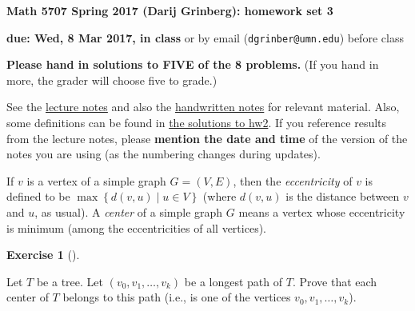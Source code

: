 \documentclass[numbers=enddot,12pt,final,onecolumn,notitlepage]{scrartcl}%
\newcounter{exer}
\theoremstyle{definition}
\newtheorem{exmp}[exer]{Exercise}
\newenvironment{exercise}[1][]
{\begin{exmp}[#1]\begin{leftbar}}
{\end{leftbar}\end{exmp}}
\newcommand{\set}[1]{\left\{ #1 \right\}}
\newcommand{\tup}[1]{\left( #1 \right)}
\begin{document}
\begin{center}
\textbf{Math 5707 Spring 2017 (Darij Grinberg): homework set 3}

\textbf{due: Wed, 8 Mar 2017, in class} or by email
(\texttt{dgrinber@umn.edu}) before class

\textbf{Please hand in solutions to FIVE of the 8 problems.}
{\color{red}
(If you hand in more, the grader will choose five to grade.)}
\end{center}

See the
\href{http://www-users.math.umn.edu/~dgrinber/5707s17/nogra.pdf}{lecture notes}
and also the
\href{http://www-users.math.umn.edu/~dgrinber/5707s17/}{handwritten notes}
for relevant material.
Also, some definitions can be found in
\href{http://www-users.math.umn.edu/~dgrinber/5707s17/hw2s.pdf}{the solutions to hw2}.
If you reference results from the lecture notes, please \textbf{mention the date and time} of the version of the notes you are using (as the numbering changes during updates).

If $v$ is a vertex of a simple graph $G = \tup{V, E}$, then the
\textit{eccentricity} of $v$ is defined to be
$\max \set{ d\tup{v, u} \mid u \in V }$ (where $d\tup{v, u}$ is the
distance between $v$ and $u$, as usual). A \textit{center} of a simple
graph $G$ means a vertex whose eccentricity is minimum (among the
eccentricities of all vertices).

\begin{exercise} \label{exe.hw3.centerlp}
Let $T$ be a tree. Let $\tup{v_0, v_1, \ldots, v_k}$ be a longest path
of $T$. Prove that each center of $T$ belongs to this path (i.e., is
one of the vertices $v_0, v_1, \ldots, v_k$).
\end{exercise}
\end{document}
